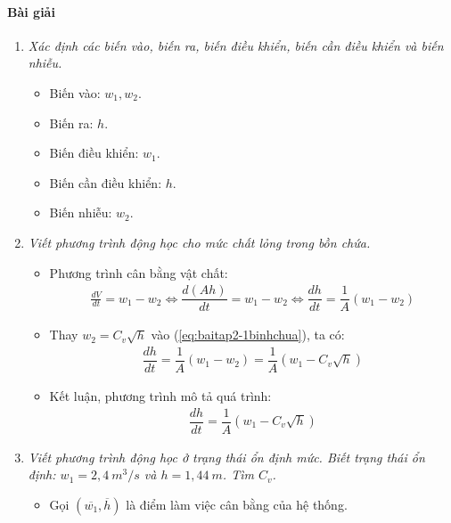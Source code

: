 \paragraph{Bài giải}
    \begin{enumerate}[\it a.]
        \item \textit{Xác định các biến vào, biến ra, biến điều khiển, biến cần điều khiển và biến nhiễu.}
            \begin{itemize}
                \item Biến vào: $w_1, w_2$.
                \item Biến ra: $h$.
                \item Biến điều khiển: $w_1$.
                \item Biến cần điều khiển: $h$.
                \item Biến nhiễu: $w_2$.
            \end{itemize}

        \item \textit{Viết phương trình động học cho mức chất lỏng trong bồn chứa.}
            \begin{itemize}
                \item Phương trình cân bằng vật chất:
                    \begin{align} \label{eq:baitap2-1binhchua}
                        \frac{dV}{dt} = w_1 - w_2 \Longleftrightarrow \dfrac{d\left({Ah}\right)}{dt} = w_1 - w_2 \Longleftrightarrow \dfrac{dh}{dt} = \dfrac{1}{A} \left({w_1 - w_2}\right)
                    \end{align}

                \item Thay $w_2 = C_v\sqrt{h}$ vào (\ref{eq:baitap2-1binhchua}), ta có:
                    \begin{align}
                        \dfrac{dh}{dt} = \dfrac{1}{A} \left({w_1 - w_2}\right) = \dfrac{1}{A} \left({w_1 - C_v\sqrt{h}}\right)
                    \end{align}

                \item Kết luận, phương trình mô tả quá trình:
                    \begin{align}
                        \dfrac{dh}{dt} = \dfrac{1}{A} \left({w_1 - C_v\sqrt{h}}\right)
                    \end{align}
            \end{itemize}

        \item \textit{Viết phương trình động học ở trạng thái ổn định mức. Biết trạng thái ổn định: $w_1 = 2,4~m^3/s$ và $h = 1,44~m$. Tìm $C_v$.}
            \begin{itemize}
                \item Gọi $\left({\overline{w_1}, \overline{h}}\right)$ là điểm làm việc cân bằng của hệ thống.


\end{itemize}
\end{enumerate}
